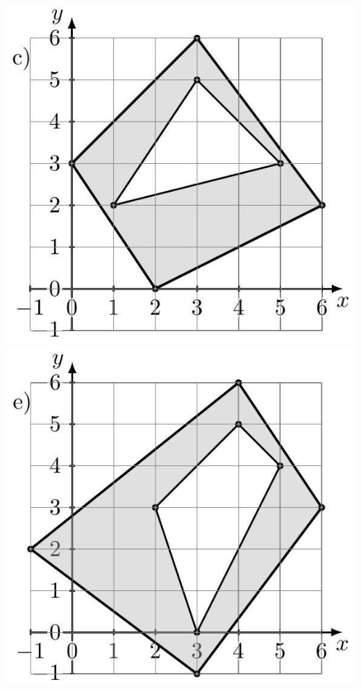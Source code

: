 \documentclass[10pt]{article}
\begin{document}
\includegraphics[max width=\textwidth, center]{2024_11_21_8f01584889ff06348ae7g-209(4)}\\
\includegraphics[max width=\textwidth, center]{2024_11_21_8f01584889ff06348ae7g-209}\\
\end{document}
